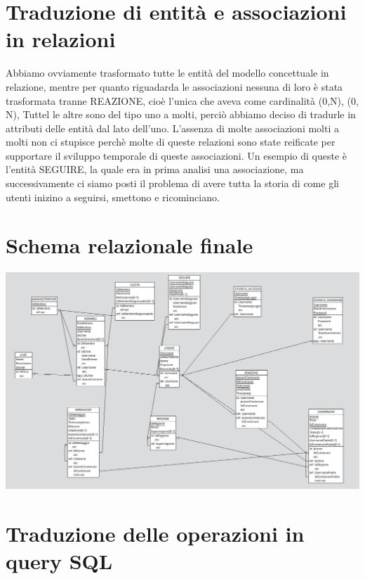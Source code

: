 \documentclass[a4paper,12pt]{report}
\begin{document}
\section{Traduzione di entità e associazioni in relazioni}
Abbiamo ovviamente trasformato tutte le entità del modello concettuale in relazione, mentre per quanto riguadarda le associazioni nessuna di loro è stata trasformata tranne REAZIONE, cioè l'unica che aveva come cardinalità (0,N), (0, N), Tuttel le altre sono del tipo uno a molti, perciò abbiamo deciso di tradurle in attributi delle entità dal lato dell'uno. L'assenza di molte associazioni molti a molti non ci stupisce perchè molte di queste relazioni sono state reificate per supportare il sviluppo temporale di queste associazioni. Un esempio di queste è l'entità SEGUIRE, la quale era in prima analisi una associazione, ma successivamente ci siamo posti il problema di avere tutta la storia di come gli utenti inizino a seguirsi, smettono e ricominciano.
\section{Schema relazionale finale}
\includegraphics[scale=0.6, angle=90]{./img/logico.png}
\section{Traduzione delle operazioni in query SQL}
\end{document}
